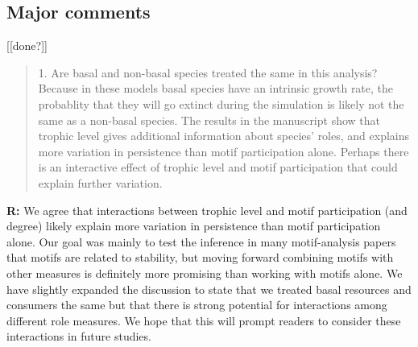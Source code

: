\documentclass[12pt]{article}
\begin{document}
  \smallskip

  \subsection*{Major comments} [[done?]]

    \begin{quotation}
      1. Are basal and non-basal species treated the same in this analysis? Because in these models basal species have an intrinsic growth rate, the probablity that they will go extinct during the simulation is likely not the same as a non-basal species. The results in the manuscript show that trophic level gives additional information about species' roles, and explains more variation in persistence than motif participation alone. Perhaps there is an interactive effect of trophic level and motif participation that could explain further variation.
    \end{quotation}

    \smallskip

    \textbf{R:} We agree that interactions between trophic level and motif participation (and degree) likely explain more variation in persistence than motif participation alone. Our goal was mainly to test the inference in many motif-analysis papers that motifs are related to stability, but moving forward combining motifs with other measures is definitely more promising than working with motifs alone. We have slightly expanded the discussion to state that we treated basal resources and consumers the same but that there is strong potential for interactions among different role measures. We hope that this will prompt readers to consider these interactions in future studies.
\end{document}
